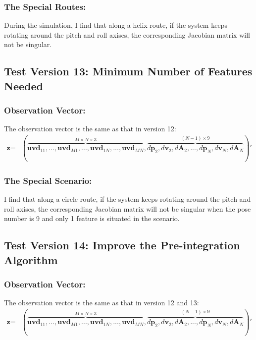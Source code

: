 \documentclass[12pt]{article}   %
\begin{document}
\subsubsection{The Special Routes:}

During the simulation, I find that along a helix route, if the system keeps rotating around the pitch and roll axises, the corresponding Jacobian matrix will not be singular.


\subsection{Test Version 13: Minimum Number of Features Needed}
\subsubsection{Observation Vector:}
The observation vector is the same as that in version 12:
\begin{align*}
\textbf{z}=&(\overbrace{\textbf{uvd}_{11}, ... , \textbf{uvd}_{M1}, ..., \textbf{uvd}_{1N}, ... , \textbf{uvd}_{MN}}^{M \times N \times 3}, \overbrace{d\textbf{p}_2, d\textbf{v}_2, d\textbf{A}_2, ..., d\textbf{p}_N, d\textbf{v}_N, d\textbf{A}_N}^{(N-1) \times 9})'
\end{align*}

\subsubsection{The Special Scenario:}

I find that along a circle route, if the system keeps rotating around the pitch and roll axises, the corresponding Jacobian matrix will not be singular when the pose number is 9 and only 1 feature is situated in the scenario.

\subsection{Test Version 14: Improve the Pre-integration Algorithm}
\subsubsection{Observation Vector:}
The observation vector is the same as that in version 12 and 13:
\begin{align*}
\textbf{z}=&(\overbrace{\textbf{uvd}_{11}, ... , \textbf{uvd}_{M1}, ..., \textbf{uvd}_{1N}, ... , \textbf{uvd}_{MN}}^{M \times N \times 3}, \overbrace{d\textbf{p}_2, d\textbf{v}_2, d\textbf{A}_2, ..., d\textbf{p}_N, d\textbf{v}_N, d\textbf{A}_N}^{(N-1) \times 9})'
\end{align*}
\end{document}
